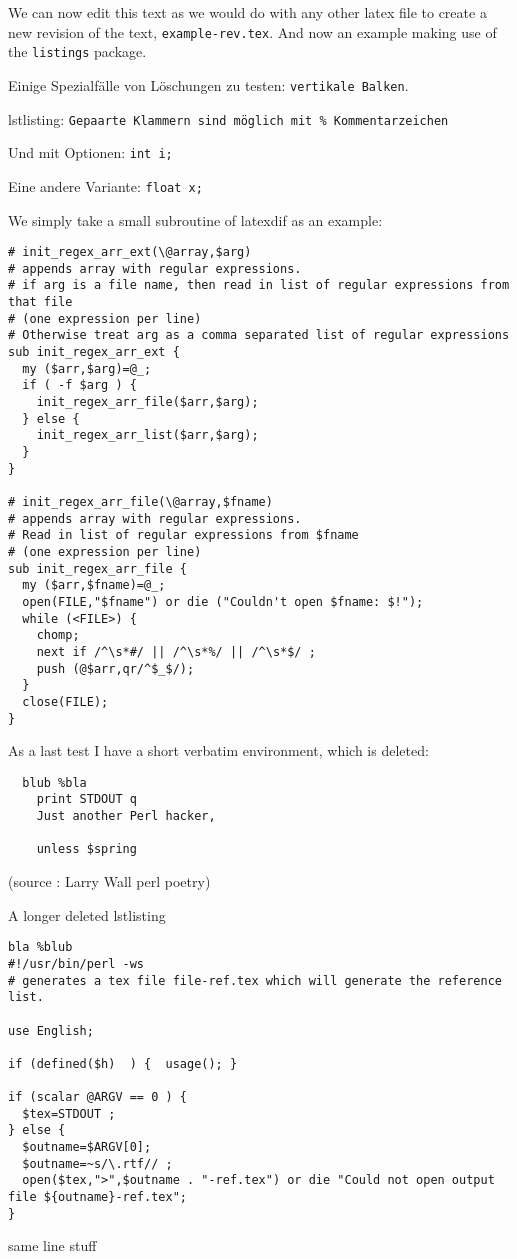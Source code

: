 \documentclass{article}
\begin{document}
We can now edit
this text as we would do with any other latex file to create
a new revision of the text, \verb|example-rev.tex|.
\newpage
And now an example making use of the \lstinline|listings| package.

Einige Spezialf\"alle von L\"oschungen zu testen: \verb|vertikale Balken|.

lstlisting: \lstinline{Gepaarte Klammern sind möglich mit % Kommentarzeichen}

Und mit Optionen: \lstinline[basicstyle=\footnotesize]{int i;}

Eine andere Variante:   \lstinline[basicstyle=\footnotesize]$float x;$ 


We simply take a small subroutine of latexdif as an example:
\lstset{language=perl}
\begin{lstlisting}[commentstyle=\color{gray}]
# init_regex_arr_ext(\@array,$arg)
# appends array with regular expressions.
# if arg is a file name, then read in list of regular expressions from that file
# (one expression per line)
# Otherwise treat arg as a comma separated list of regular expressions
sub init_regex_arr_ext {
  my ($arr,$arg)=@_;
  if ( -f $arg ) {
    init_regex_arr_file($arr,$arg);
  } else {
    init_regex_arr_list($arr,$arg);
  }
}

# init_regex_arr_file(\@array,$fname)
# appends array with regular expressions.
# Read in list of regular expressions from $fname
# (one expression per line)
sub init_regex_arr_file {
  my ($arr,$fname)=@_;
  open(FILE,"$fname") or die ("Couldn't open $fname: $!");
  while (<FILE>) {
    chomp;
    next if /^\s*#/ || /^\s*%/ || /^\s*$/ ;
    push (@$arr,qr/^$_$/);
  }
  close(FILE);
}
\end{lstlisting}

As a last test I have a short verbatim environment, which is deleted:
\begin{verbatim}  blub %bla
    print STDOUT q
    Just another Perl hacker,
   
    unless $spring
\end{verbatim}
(source : Larry Wall perl poetry)

A longer deleted lstlisting 
\begin{lstlisting}[commentstyle=\color{gray}]  bla %blub
#!/usr/bin/perl -ws
# generates a tex file file-ref.tex which will generate the reference list.

use English; 

if (defined($h)  ) {  usage(); }

if (scalar @ARGV == 0 ) {
  $tex=STDOUT ; 
} else {
  $outname=$ARGV[0];
  $outname=~s/\.rtf// ;
  open($tex,">",$outname . "-ref.tex") or die "Could not open output file ${outname}-ref.tex";
}
\end{lstlisting}  same line stuff
\end{document}
